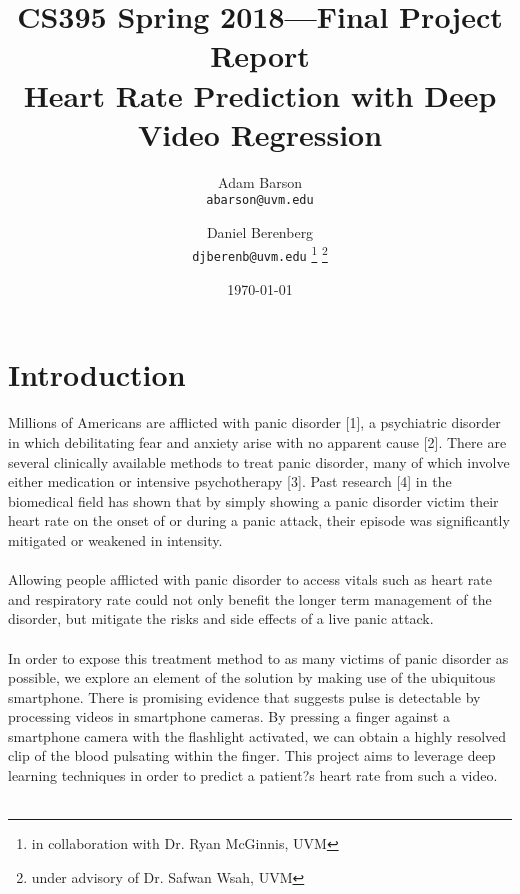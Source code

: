 \documentclass{article}
\title{CS395 Spring 2018---Final Project Report \\ \large Heart Rate Prediction with Deep Video Regression}
\author{
  Adam Barson \\ \small{\texttt{abarson@uvm.edu}}
  \and Daniel Berenberg \\ \small{\texttt{djberenb@uvm.edu}
  \thanks{in collaboration with Dr. Ryan McGinnis, UVM} 
 \thanks{under advisory of Dr. Safwan Wsah, UVM}}
}
\date{\today}
\begin{document}
\maketitle
\section*{Introduction}
Millions of Americans are afflicted with panic disorder [1], a psychiatric disorder in which debilitating fear and anxiety arise with no apparent cause [2]. There are several clinically available methods to treat panic disorder, many of which involve either medication or intensive psychotherapy [3]. Past research [4] in the biomedical field has shown that by simply showing a panic disorder victim their heart rate on the onset of or during a panic attack, their episode was significantly mitigated or weakened in intensity. \\ \\
Allowing people afflicted with panic disorder to access vitals such as heart rate and respiratory rate could not only benefit the longer term management of the disorder, but mitigate the risks and side effects of a live panic attack. \\ \\
In order to expose this treatment method to as many victims of panic disorder as possible, we explore an element of the solution by making use of the ubiquitous smartphone. There is promising evidence that suggests pulse is detectable by processing videos in smartphone cameras. By pressing a finger against a smartphone camera with the flashlight activated, we can obtain a highly resolved clip of the blood pulsating within the finger. This project aims to leverage deep learning techniques in order to predict a patient?s heart rate from such a video. \\ \\
\end{document}
